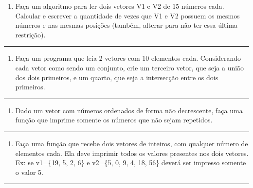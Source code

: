 \documentclass[12pt,a4paper]{article}
\providecommand{\tightlist}{%
      \setlength{\itemsep}{0pt}\setlength{\parskip}{0pt}}
\begin{document}
\begin{enumerate}
\def\labelenumi{\arabic{enumi}.}
\setcounter{enumi}{11}
\tightlist
\item
  Faça um algoritmo para ler dois vetores V1 e V2 de 15 números cada.
  Calcular e escrever a quantidade de vezes que V1 e V2 possuem os
  mesmos números e nas mesmas posições (também, alterar para não ter
  essa última restrição).
\end{enumerate}

    \begin{center}\rule{0.5\linewidth}{0.5pt}\end{center}

\begin{enumerate}
\def\labelenumi{\arabic{enumi}.}
\setcounter{enumi}{12}
\tightlist
\item
  Faça um programa que leia 2 vetores com 10 elementos cada.
  Considerando cada vetor como sendo um conjunto, crie um terceiro
  vetor, que seja a união dos dois primeiros, e um quarto, que seja a
  intersecção entre os dois primeiros.
\end{enumerate}

    \begin{center}\rule{0.5\linewidth}{0.5pt}\end{center}

\begin{enumerate}
\def\labelenumi{\arabic{enumi}.}
\setcounter{enumi}{13}
\tightlist
\item
  Dado um vetor com números ordenados de forma não decrescente, faça uma
  função que imprime somente os números que não sejam repetidos.
\end{enumerate}

    \begin{center}\rule{0.5\linewidth}{0.5pt}\end{center}

\begin{enumerate}
\def\labelenumi{\arabic{enumi}.}
\setcounter{enumi}{14}
\tightlist
\item
  Faça uma função que recebe dois vetores de inteiros, com qualquer
  número de elementos cada. Ela deve imprimir todos os valores presentes
  nos dois vetores. Ex: se v1=\{19, 5, 2, 6\} e v2=\{5, 0, 9, 4, 18,
  56\} deverá ser impresso somente o valor 5.
\end{enumerate}

    \begin{center}\rule{0.5\linewidth}{0.5pt}\end{center}
\end{document}
